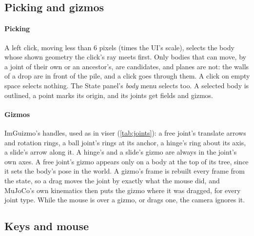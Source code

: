 \subsection{Picking and gizmos}\label{sec:gizmos}

\paragraph{Picking} A left click, moving less than 6 pixels (times the UI's scale), selects the body whose shown geometry the click's ray meets first. Only bodies that can move, by a joint of their own or an ancestor's, are candidates, and planes are not: the walls of a drop are in front of the pile, and a click goes through them. A click on empty space selects nothing. The State panel's \emph{body} menu selects too. A selected body is outlined, a point marks its origin, and its joints get fields and gizmos.

\paragraph{Gizmos} ImGuizmo's handles, used as in viser (\cref{tab:joints}): a free joint's translate arrows and rotation rings, a ball joint's rings at its anchor, a hinge's ring about its axis, a slide's arrow along it. A hinge's and a slide's gizmo are always in the joint's own axes. A free joint's gizmo appears only on a body at the top of its tree, since it sets the body's pose in the world. A gizmo's frame is rebuilt every frame from the state, so a drag moves the joint by exactly what the mouse did, and MuJoCo's own kinematics then puts the gizmo where it was dragged, for every joint type. While the mouse is over a gizmo, or drags one, the camera ignores it.

\subsection{Keys and mouse}\label{sec:keys}


